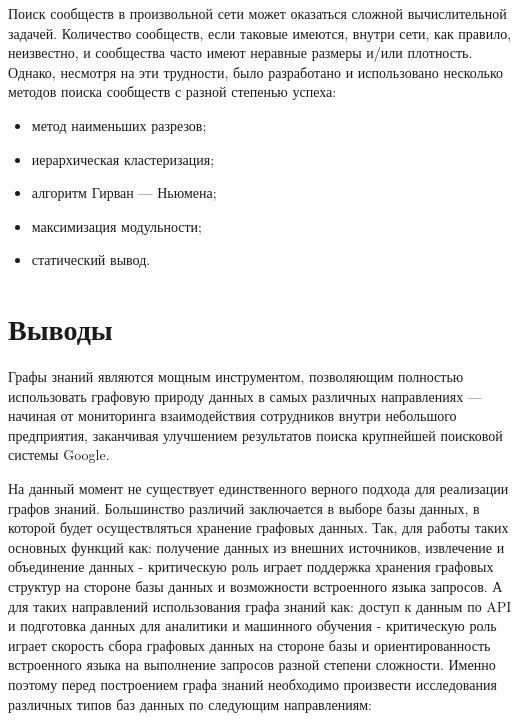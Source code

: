 Поиск сообществ в произвольной сети может оказаться сложной вычислительной задачей. Количество сообществ, если таковые имеются, внутри сети, как правило, неизвестно, и сообщества часто имеют неравные размеры и/или плотность. Однако, несмотря на эти трудности, было разработано и использовано несколько методов поиска сообществ с разной степенью успеха:

\begin{itemize}
    \item метод наименьших разрезов;
    \item иерархическая кластеризация;
    \item алгоритм Гирван — Ньюмена;
    \item максимизация модульности;
    \item статический вывод.
\end{itemize}


\section{Выводы}

Графы знаний являются мощным инструментом, позволяющим полностью использовать графовую природу данных в самых различных направлениях — начиная от мониторинга взаимодействия сотрудников внутри небольшого предприятия, заканчивая улучшением результатов поиска крупнейшей поисковой системы Google.

На данный момент не существует единственного верного подхода для реализации графов знаний. Большинство различий заключается в выборе базы данных, в которой будет осуществляться хранение графовых данных. Так, для работы таких основных функций как: получение данных из внешних источников, извлечение и объединение данных - критическую роль играет поддержка хранения графовых структур на стороне базы данных и возможности встроенного языка запросов. А для таких направлений использования графа знаний как: доступ к данным по API и подготовка данных для аналитики и машинного обучения - критическую роль играет скорость сбора графовых данных на стороне базы и ориентированность встроенного языка на выполнение запросов разной степени сложности. Именно поэтому перед построением графа знаний необходимо произвести исследования различных типов баз данных по следующим направлениям:

